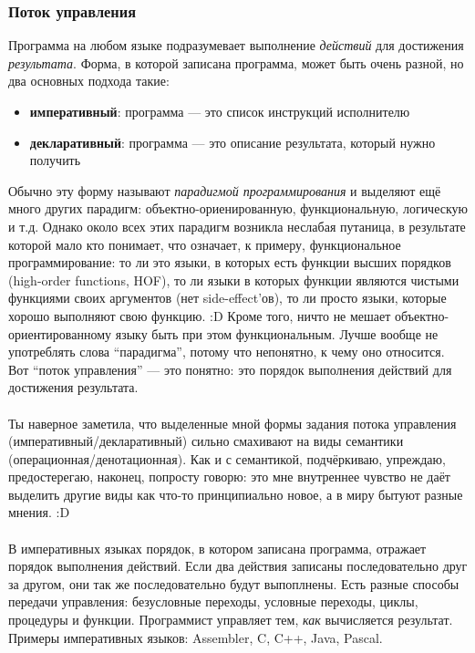 \documentclass[11pt]{book}
\begin{document}
\subsubsection{Поток управления}
Программа на любом языке подразумевает выполнение \emph{действий} для достижения \emph{результата}.
Форма, в которой записана программа, может быть очень разной, но два основных подхода такие:
\begin{itemize}
\item \textbf{императивный}: программа --- это список инструкций исполнителю
\item \textbf{декларативный}: программа --- это описание результата, который нужно получить
\end{itemize}
Обычно эту форму называют \emph{парадигмой программирования} и выделяют ещё много других парадигм:
объектно-ориенированную, функциональную, логическую и т.д.
Однако около всех этих парадигм возникла неслабая путаница, в результате которой мало кто понимает,
что означает, к примеру, функциональное программирование: то ли это языки, в которых есть функции высших порядков
(high-order functions, HOF), то ли языки в которых функции являются чистыми функциями своих аргументов (нет side-effect'ов),
то ли просто языки, которые хорошо выполняют свою функцию. :D
Кроме того, ничто не мешает объектно-ориентированному языку быть при этом функциональным.
Лучше вообще не употреблять слова ``парадигма'', потому что непонятно, к чему оно относится.
Вот ``поток управления'' --- это понятно: это порядок выполнения действий для достижения результата.
\\ \\
Ты наверное заметила, что выделенные мной формы задания потока управления
(императивный/декларативный) сильно смахивают на виды семантики (операционная/денотационная).
Как и с семантикой, подчёркиваю, упреждаю, предостерегаю, наконец, попросту говорю:
это мне внутреннее чувство не даёт выделить другие виды как что-то принципиально новое,
а в миру бытуют разные мнения. :D
\\ \\
В императивных языках порядок, в котором записана программа, отражает порядок выполнения действий.
Если два действия записаны последовательно друг за другом, они так же последовательно будут выпоплнены.
Есть разные способы передачи управления: безусловные переходы, условные переходы, циклы, процедуры и функции.
Программист управляет тем, \emph{как} вычисляется результат.
Примеры императивных языков: Assembler, C, C++, Java, Pascal.
\\ \\
\end{document}
